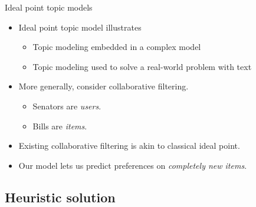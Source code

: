 \message{ !name(sgerrish_prefpo.tex)}\documentclass{beamer}
\begin{document}
\begin{frame}{Ideal point topic models}
  \begin{itemize}
  \item Ideal point topic model illustrates
    \begin{itemize}
    \item Topic modeling embedded in a complex model
    \item Topic modeling used to solve a real-world problem with text
    \end{itemize}
  \item More generally, consider collaborative filtering.
    \begin{itemize}
    \item Senators are \textit{users}.
    \item Bills are \textit{items}.
    \end{itemize}
  \item Existing collaborative filtering is akin to classical ideal
    point.
  \item Our model lets us predict preferences on \textit{completely new items}.
  \end{itemize}
\end{frame}



\subsection{Heuristic solution}
\end{document}
